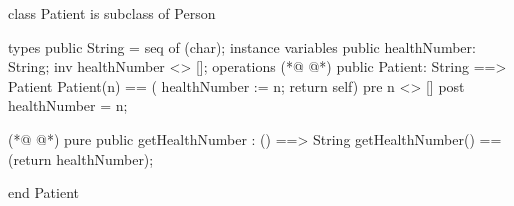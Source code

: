 \begin{vdmpp}[breaklines=true]
class Patient is subclass of Person

types
 public String = seq of (char);
instance variables
  public healthNumber: String;
  inv healthNumber <> [];
operations
(*@
\label{Patient:9}
@*)
 public Patient: String ==> Patient
  Patient(n) == ( healthNumber := n; return self)
 pre n <> []
 post healthNumber = n;
 
(*@
\label{getHealthNumber:14}
@*)
 pure public getHealthNumber : () ==> String
  getHealthNumber() == (return healthNumber);

end Patient
\end{vdmpp}
